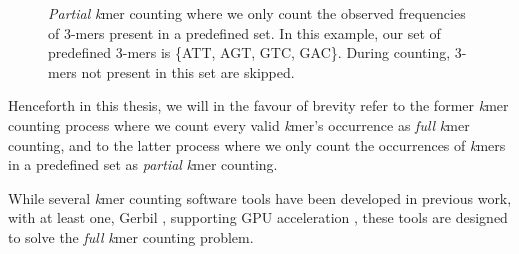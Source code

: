 \begin{figure}[H]
\begin{center}
{
}
\caption{
  \textit{Partial} \textit{k}mer counting where we only count the observed frequencies of 3-mers present in a predefined set. In this example, our set of predefined 3-mers is \{ATT, AGT, GTC, GAC\}. During counting, 3-mers not present in this set are skipped.
}
\label{background:kmers_and_kmer_counting:partial_kmer_counting:figure}
\end{center}
\end{figure}

Henceforth in this thesis, we will in the favour of brevity refer to the former \textit{k}mer counting process where we count every valid \textit{k}mer's occurrence as \textit{full} \textit{k}mer counting, and to the latter process where we only count the occurrences of \textit{k}mers in a predefined set as \textit{partial} \textit{k}mer counting.

While several \textit{k}mer counting software tools have been developed in previous work, with at least one, Gerbil \cite{gerbil}, supporting GPU acceleration \cite{kmer_counting_tools}, these tools are designed to solve the \textit{full} \textit{k}mer counting problem.
